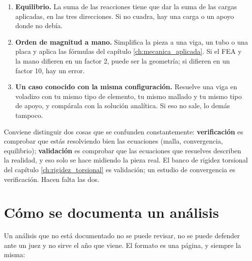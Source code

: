 \begin{enumerate}
  \item \textbf{Equilibrio.} La suma de las reacciones tiene que dar la suma de
        las cargas aplicadas, en las tres direcciones. Si no cuadra, hay una carga
        o un apoyo donde no debía.
  \item \textbf{Orden de magnitud a mano.} Simplifica la pieza a una viga, un
        tubo o una placa y aplica las fórmulas del capítulo
        \ref{ch:mecanica_aplicada}. Si el FEA y la mano difieren en un factor 2,
        puede ser la geometría; si difieren en un factor 10, hay un error.
  \item \textbf{Un caso conocido con la misma configuración.} Resuelve una viga
        en voladizo con tu mismo tipo de elemento, tu mismo mallado y tu mismo
        tipo de apoyo, y compárala con la solución analítica. Si eso no sale, lo
        demás tampoco.
\end{enumerate}

\begin{clave}
Conviene distinguir dos cosas que se confunden constantemente:
\textbf{verificación} es comprobar que estás resolviendo bien las ecuaciones
(malla, convergencia, equilibrio); \textbf{validación} es comprobar que las
ecuaciones que resuelves describen la realidad, y eso solo se hace midiendo la
pieza real. El banco de rigidez torsional del capítulo
\ref{ch:rigidez_torsional} es validación; un estudio de convergencia es
verificación. Hacen falta las dos.
\end{clave}

\section{Cómo se documenta un análisis}
\label{sec:elementos_finitos:05}

Un análisis que no está documentado no se puede revisar, no se puede defender
ante un juez y no sirve el año que viene. El formato es una página, y siempre la
misma:

